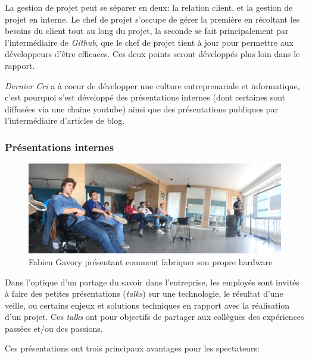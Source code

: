 \bigskip

La gestion de projet peut se séparer en deux: la relation client, et la
gestion de projet en interne. Le chef de projet s'occupe de gérer la
première en récoltant les besoins du client tout au long du projet, la
seconde se fait principalement par l'intermédiaire de \emph{Github}, que
le chef de projet tient à jour pour permettre aux développeurs d'être
efficaces. Ces deux points seront développés plus loin dans le rapport.

\bigskip

\emph{Dernier Cri} a à coeur de développer une culture entreprenariale
et informatique, c'est pourquoi s'est développé des présentations
internes (dont certaines sont diffusées via une chaine youtube) ainsi
que des présentations publiques par l'intermédiaire d'articles de blog.

\subsubsection{Présentations internes}\label{pruxe9sentations-internes}

\begin{figure}[h]
  \centering
  \includegraphics[height=4cm]{figures/talk.jpg}
  \caption{Fabien Gavory présentant comment fabriquer son propre hardware}
\end{figure}

\bigskip

Dans l'optique d'un partage du savoir dans l'entreprise, les employés
sont invités à faire des petites présentations (\emph{talks}) sur une
technologie, le résultat d'une veille, ou certains enjeux et solutions
techniques en rapport avec la réalisation d'un projet. Ces \emph{talks}
ont pour objectifs de partager aux collègues des expériences passées
et/ou des passions.

\bigskip

Ces présentations ont trois principaux avantages pour les spectateurs:

